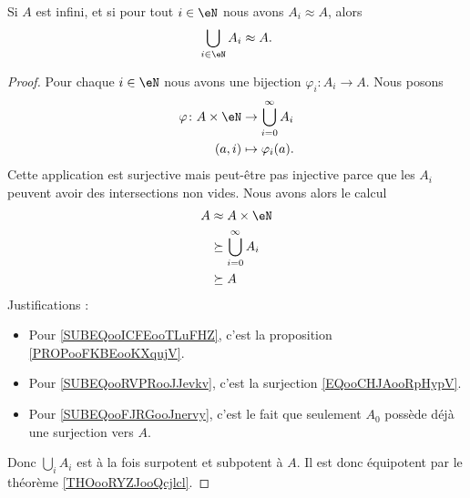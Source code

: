 \begin{lemma}       \label{LEMooNKKDooUvSYPO}
	Si \( A\) est infini, et si pour tout \( i\in \eN\) nous avons \( A_i\approx A\), alors
	\begin{equation}
		\bigcup_{i\in \eN}A_i\approx A.
	\end{equation}
\end{lemma}

\begin{proof}
	Pour chaque \( i\in \eN\) nous avons une bijection \( \varphi_i\colon A_i\to A\). Nous posons
	\begin{equation}        \label{EQooCHJAooRpHypV}
		\begin{aligned}
			\varphi\colon A\times \eN & \to \bigcup_{i=0}^{\infty}A_i \\
			(a,i)                     & \mapsto \varphi_i(a).
		\end{aligned}
	\end{equation}
	Cette application est surjective mais peut-être pas injective parce que les \( A_i\) peuvent avoir des intersections non vides. Nous avons alors le calcul
	\begin{subequations}
		\begin{align}
			A & \approx A\times \eN        \label{SUBEQooICFEooTLuFHZ}             \\
			  & \succeq \bigcup_{i=0}^{\infty}A_i      \label{SUBEQooRVPRooJJevkv} \\
			  & \succeq A      \label{SUBEQooFJRGooJnervy}
		\end{align}
	\end{subequations}
	Justifications :
	\begin{itemize}
		\item Pour \eqref{SUBEQooICFEooTLuFHZ}, c'est la proposition \ref{PROPooFKBEooKXqujV}.
		\item Pour \eqref{SUBEQooRVPRooJJevkv}, c'est la surjection \eqref{EQooCHJAooRpHypV}.
		\item Pour \eqref{SUBEQooFJRGooJnervy}, c'est le fait que seulement \( A_0\) possède déjà une surjection vers \( A\).
	\end{itemize}
	Donc \( \bigcup_iA_i\) est à la fois surpotent et subpotent à \( A\). Il est donc équipotent par le théorème \ref{THOooRYZJooQcjlcl}.
\end{proof}
